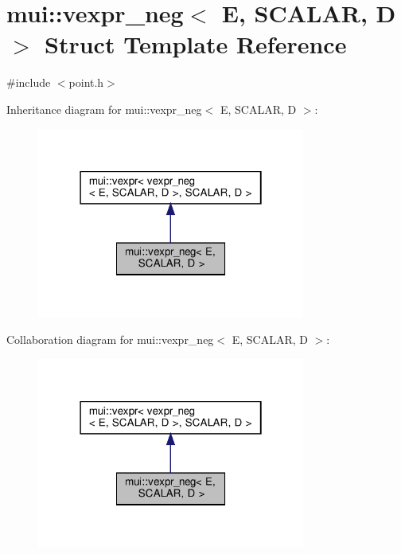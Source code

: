 \hypertarget{structmui_1_1vexpr__neg}{}\section{mui\+:\+:vexpr\+\_\+neg$<$ E, S\+C\+A\+L\+AR, D $>$ Struct Template Reference}
\label{structmui_1_1vexpr__neg}


{\ttfamily \#include $<$point.\+h$>$}



Inheritance diagram for mui\+:\+:vexpr\+\_\+neg$<$ E, S\+C\+A\+L\+AR, D $>$\+:
\nopagebreak
\begin{figure}[H]
\begin{center}
\leavevmode
\includegraphics[width=250pt]{structmui_1_1vexpr__neg__inherit__graph}
\end{center}
\end{figure}


Collaboration diagram for mui\+:\+:vexpr\+\_\+neg$<$ E, S\+C\+A\+L\+AR, D $>$\+:
\nopagebreak
\begin{figure}[H]
\begin{center}
\leavevmode
\includegraphics[width=250pt]{structmui_1_1vexpr__neg__coll__graph}
\end{center}
\end{figure}
